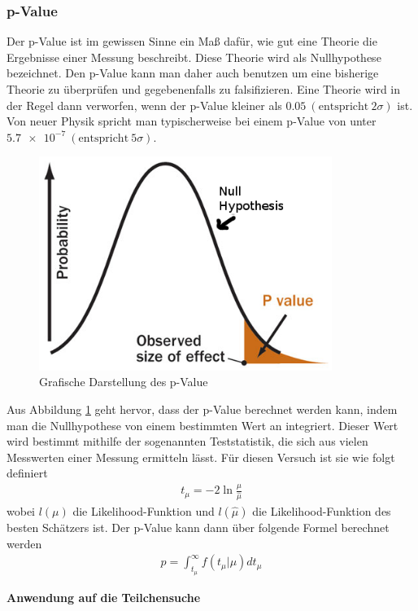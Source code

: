 \subsubsection{p-Value}
Der p-Value ist im gewissen Sinne ein Maß dafür, wie gut eine Theorie die Ergebnisse einer Messung beschreibt.
Diese Theorie wird als Nullhypothese bezeichnet.
Den p-Value kann man daher auch benutzen um eine bisherige Theorie zu überprüfen und gegebenenfalls zu falsifizieren.
Eine Theorie wird in der Regel dann verworfen, wenn der p-Value kleiner als $\num{0.05} \ (\text{entspricht} \ 2 \sigma)$ ist.
Von neuer Physik spricht man typischerweise bei einem p-Value von unter $\num{5.7e-7} \ (\text{entspricht}\ 5 \sigma)$.
\begin{figure}
\centering
\includegraphics[width=0.85\textwidth]{../Pictures/p_value.png}
\caption{Grafische Darstellung des p-Value \cite{p_val}}
\label{fig_p_value}
\end{figure}
Aus Abbildung \ref{fig_p_value} geht hervor, dass der p-Value berechnet werden kann, indem man die Nullhypothese von einem bestimmten Wert an integriert.
Dieser Wert wird bestimmt mithilfe der sogenannten Teststatistik, die sich aus vielen Messwerten einer Messung ermitteln lässt.
Für diesen Versuch ist sie wie folgt definiert
\begin{gather}
t_{\mu} = -2 \ln{\frac{\mu}{\hat{\mu}}}
\end{gather}
wobei $l(\mu)$ die Likelihood-Funktion und $l(\hat{\mu})$ die Likelihood-Funktion des besten Schätzers ist.
Der p-Value kann dann über folgende Formel berechnet werden
\begin{gather}
p = \int_{t_{\mu}}^{\infty} f(t_{\mu}|\mu)dt_{\mu}
\end{gather}

\textbf{Anwendung auf die Teilchensuche}

